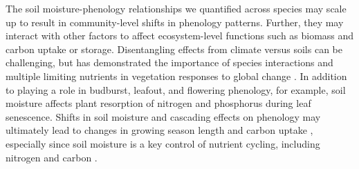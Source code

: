 \documentclass{article}
\begin{document}
\par The soil moisture-phenology relationships we quantified across species may scale up to result in community-level shifts in phenology patterns. Further, they may interact with other factors to affect ecosystem-level functions such as biomass and carbon uptake or storage. Disentangling effects from climate versus soils can be challenging, but has demonstrated the importance of species interactions and multiple limiting nutrients in vegetation responses to global change \citep{wilfahrt2021}. In addition to playing a role in  budburst, leafout, and flowering phenology, for example, soil moisture affects plant resorption of nitrogen and phosphorus during leaf senescence\citep{estiarte2022}. Shifts in soil moisture and cascading effects on phenology may ultimately lead to changes in growing season length and carbon uptake \citep{wolkovich2025longer}, especially since soil moisture is a key control of nutrient cycling, including nitrogen and carbon \citep{liu2019soil}.
\end{document}
